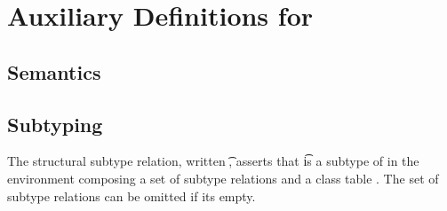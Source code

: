 \documentclass[acmlarge, anonymous, authordraft]{acmart}
\begin{document}



\clearpage

\appendix
\section{Auxiliary Definitions for \kafka}%
\label{appendix:kafka}



\subsection{Semantics}

\subsection{Subtyping}

The structural subtype relation, written \StrSub\M\K\t\tp, asserts that \t
is a subtype of \tp in the environment \M composing a set of subtype relations and
a class table \K.   The set of subtype relations can be omitted if its empty.

~\\

\begin{mathpar}


\end{mathpar}

\begin{mathpar}
\end{mathpar}
\end{document}
